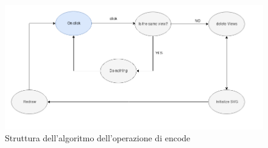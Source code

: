 {\begin{figure}[!htb]
	\begin{center}
		\includegraphics[width=1 \linewidth]{figure/viewAlg}
	\end{center}
	\caption{Struttura dell'algoritmo dell'operazione di encode\label{fig:viewAlg}}
\end{figure}

}
